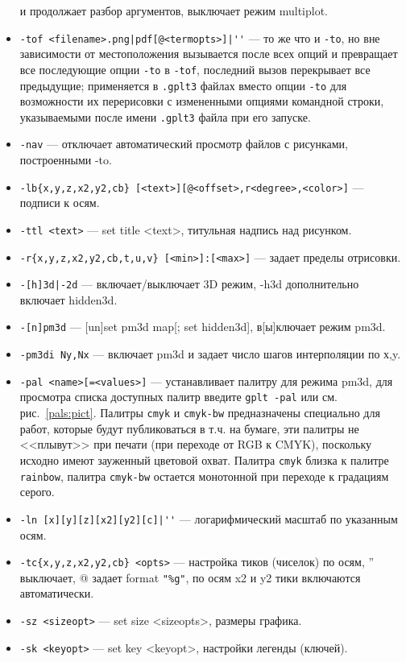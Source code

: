 \documentclass[12pt]{article}
\begin{document}
\begin{itemize}
  и продолжает разбор аргументов, выключает режим multiplot.
\item \verb:-tof <filename>.png|pdf[@<termopts>]|'': --- то же что и \verb'-to', но вне зависимости 
  от местоположения вызывается после всех опций и превращает все последующие
   опции \verb'-to' в \verb'-tof', последний вызов перекрывает все предыдущие; применяется в
   \verb'.gplt3' файлах вместо опции \verb'-to' для возможности их перерисовки с измененными опциями командной строки, указываемыми после имени
   \verb'.gplt3' файла при его запуске.
\item \verb'-nav' --- отключает автоматический просмотр файлов с рисунками, построенными -to.                     
\item \verb'-lb{x,y,z,x2,y2,cb} [<text>][@<offset>,r<degree>,<color>]' --- подписи к осям.
\item \verb'-ttl <text>' --- set title <text>, титульная надпись над рисунком.
\item \verb'-r{x,y,z,x2,y2,cb,t,u,v} [<min>]:[<max>]' --- задает пределы отрисовки.
\item \verb'-[h]3d|-2d' --- включает/выключает 3D режим, -h3d дополнительно включает hidden3d.
\item \verb'-[n]pm3d' --- [un]set pm3d map[; set hidden3d], в[ы]ключает режим pm3d.
\item \verb'-pm3di Ny,Nx' --- включает pm3d и задает число шагов интерполяции по х,y.
\item \verb'-pal <name>[=<values>]' --- устанавливает палитру для режима pm3d, для просмотра списка
  доступных палитр введите \verb'gplt -pal' или см. рис.~\ref{pals:pict}.
  Палитры \verb'cmyk' и \verb'cmyk-bw' предназначены специально для работ, которые будут публиковаться в т.ч. на бумаге,
  эти палитры не <<плывут>> при печати (при переходе от RGB к CMYK),
  поскольку исходно имеют зауженный цветовой охват. Палитра \verb'cmyk'  близка к палитре \verb'rainbow', палитра \verb'cmyk-bw'
  остается монотонной при переходе к градациям серого.
\item \verb:-ln [x][y][z][x2][y2][c]|'': --- логарифмический масштаб по указанным осям.
\item \verb'-tc{x,y,z,x2,y2,cb} <opts>'  --- настройка тиков (чиселок) по осям, '' выключает,
             @ задает format \verb'"%g"', по осям x2 и y2 тики включаются автоматически. 
\item \verb'-sz <sizeopt>' ---  set size <sizeopts>, размеры графика. 
\item \verb'-sk <keyopt>' --- set key <keyopt>, настройки легенды (ключей).

\end{itemize}
\end{document}
